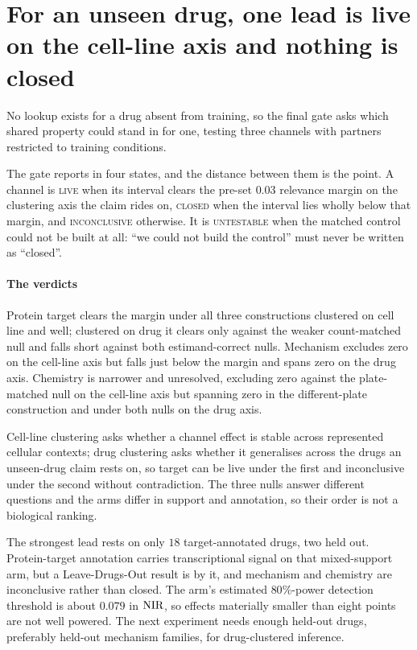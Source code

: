 \section{For an unseen drug, one lead is live on the cell-line axis and nothing
is closed}

No lookup exists for a drug absent from training, so the final gate asks which
shared property could stand in for one, testing three channels with partners
restricted to training conditions.

The gate reports in four states, and the distance between them is the point. A
channel is \textsc{live} when its interval clears the pre-set $0.03$ relevance
margin on the clustering axis the claim rides on, \textsc{closed} when the
interval lies wholly below that margin, and \textsc{inconclusive} otherwise. It
is \textsc{untestable} when the matched control could not be built at all: ``we
could not build the control'' must never be written as
``closed''.

\paragraph{The verdicts} Protein target clears the margin under all three
constructions clustered on cell line and well; clustered on drug it clears only
against the weaker count-matched null and falls short against both
estimand-correct nulls. Mechanism excludes zero on the cell-line axis but falls
just below the margin and spans zero on the drug axis. Chemistry is narrower and
unresolved, excluding zero against the plate-matched null on the cell-line axis
but spanning zero in the different-plate construction and under both nulls on the
drug axis.

Cell-line clustering asks whether a channel effect is stable across represented
cellular contexts; drug clustering asks whether it generalises across the
drugs an unseen-drug claim rests on, so target can be live under the first
and inconclusive under the second without contradiction. The three nulls answer
different questions and the arms differ in support and annotation, so their order
is not a biological ranking.

The strongest lead rests on only $18$ target-annotated drugs, two held out.
Protein-target annotation carries transcriptional signal on that mixed-support
arm, but a Leave-Drugs-Out result is \notestablished by it, and mechanism and
chemistry are inconclusive rather than closed. The arm's estimated $80\%$-power
detection threshold is about $0.079$ in $\textrm{NIR}$, so effects materially smaller
than eight points are not well powered. The next experiment needs enough held-out
drugs, preferably held-out mechanism families, for drug-clustered inference.

